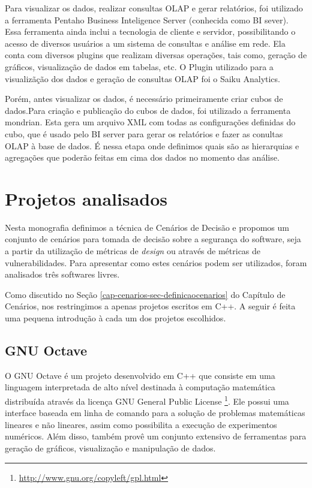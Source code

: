 Para visualizar os dados, realizar consultas OLAP e gerar relatórios, foi utilizado a ferramenta Pentaho Business Inteligence Server (conhecida como BI sever). Essa ferramenta ainda inclui a tecnologia de cliente e servidor, possibilitando o acesso de diversos usuários a um sistema de consultas e análise em rede. Ela conta com diversos plugins que realizam diversas operações, tais como, geração de gráficos, visualização de dados em tabelas, etc. O Plugin utilizado para a visualizãção dos dados e geração de consultas OLAP foi o Saiku Analytics.

Porém, antes visualizar os dados, é necessário primeiramente criar cubos de dados.Para criação e publicação do cubos de dados, foi utilizado a ferramenta mondrian. Esta gera um arquivo XML com todas as configurações definidas do cubo, que é usado pelo BI server para gerar os relatórios e fazer as conultas OLAP à base de dados. É nessa etapa onde definimos quais são as hierarquias e agregações que poderão feitas em cima dos dados no momento das análise.



\section{Projetos analisados}
\label{cap-projects}

Nesta monografia definimos a técnica de Cenários de Decisão e propomos um conjunto de cenários para tomada de decisão sobre a segurança do software, seja a partir da utilização de métricas de \emph{design} ou através de métricas de vulnerabilidades. Para apresentar como estes cenários podem ser utilizados, foram analisados três softwares livres. 

Como discutido no Seção \ref{cap-cenarios-sec-definicaocenarios} do Capítulo de Cenários, nos restringimos a apenas projetos escritos em C++. A seguir é feita uma pequena introdução à cada um dos projetos escolhidos.

\subsection{GNU Octave}
\label{section-octave}

O GNU Octave é um projeto desenvolvido em C++ que consiste em uma linguagem interpretada de alto nível destinada à computação matemática distribuída através da licença GNU General Public License \footnote{\url{http://www.gnu.org/copyleft/gpl.html}}. Ele possui uma interface baseada em linha de comando para a solução de problemas matemáticas lineares e não lineares, assim como possibilita a execução de experimentos numéricos. Além disso, também provê um conjunto extensivo de ferramentas para geração de gráficos, visualização e manipulação de dados.

